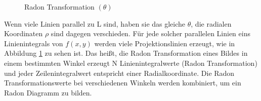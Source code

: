 \begin{figure}[H]
\begin{minipage}[b]{0.49\textwidth}
\caption{Radon Transformation $(\theta)$}
\label{fig:Parallele Linienintegral}
\end{minipage}
\end{figure}

Wenn viele Linien parallel zu L sind, haben sie das gleiche $ \theta $, die radialen Koordinaten $ \rho $ sind dagegen verschieden. Für jede solcher parallelen Linien eins Linienintegrals von $ f(x, y) $ werden viele Projektionslinien erzeugt, wie in Abbildung \ref{fig:Parallele Linienintegral} zu sehen ist. Das heißt, die Radon Transformation eines Bildes in einem bestimmten Winkel erzeugt N Linienintegralwerte (Radon Transformation) und jeder Zeilenintegralwert entspricht einer Radialkoordinate. Die Radon Transformationswerte bei verschiedenen Winkeln werden kombiniert, um ein Radon Diagramm zu bilden.

